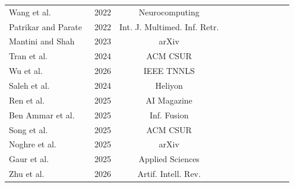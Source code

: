 \documentclass[10pt,a4paper]{article}
\newcommand{\CIRCLE}{\usebox{\hbFull}}
\newcommand{\LEFTcircle}{\usebox{\hbHalf}}
\newcommand{\Circle}{\usebox{\hbEmpty}}
\begin{document}
\begin{table}[!t]
{\begin{tabular}{llccccccccc}
Wang et al.~\citeyearpar{wang2022deep_fire} & 2022 & Neurocomputing & \Circle & \CIRCLE & \Circle & \CIRCLE & \LEFTcircle & \LEFTcircle & \Circle & \LEFTcircle \\
Patrikar and Parate~\citeyearpar{patrikar2022anomaly} & 2022 & Int. J. Multimed. Inf. Retr. & \CIRCLE & \Circle & \Circle & \CIRCLE & \CIRCLE & \LEFTcircle & \Circle & \LEFTcircle \\
Mantini and Shah~\citeyearpar{mantini2023feature_survey} & 2023 & arXiv & \Circle & \Circle & \CIRCLE & \LEFTcircle & \Circle & \Circle & \Circle & \LEFTcircle \\
Tran et al.~\citeyearpar{tran2024anomaly_images_videos} & 2024 & ACM CSUR & \CIRCLE & \Circle & \Circle & \CIRCLE & \CIRCLE & \CIRCLE & \LEFTcircle & \Circle \\
Wu et al.~\citeyearpar{wu2024deep_review} & 2026 & IEEE TNNLS & \CIRCLE & \Circle & \Circle & \CIRCLE & \CIRCLE & \CIRCLE & \LEFTcircle & \LEFTcircle \\
Saleh et al.~\citeyearpar{saleh2024forest_fire} & 2024 & Heliyon & \Circle & \CIRCLE & \Circle & \CIRCLE & \LEFTcircle & \LEFTcircle & \Circle & \LEFTcircle \\
Ren et al.~\citeyearpar{ren2025foundation_anomaly} & 2025 & AI Magazine & \LEFTcircle & \Circle & \Circle & \LEFTcircle & \LEFTcircle & \CIRCLE & \CIRCLE & \LEFTcircle \\
Ben Ammar et al.~\citeyearpar{benammar2025foundation_transformer} & 2025 & Inf. Fusion & \LEFTcircle & \Circle & \Circle & \LEFTcircle & \LEFTcircle & \CIRCLE & \CIRCLE & \Circle \\
Song et al.~\citeyearpar{song2024networking_vad} & 2025 & ACM CSUR & \CIRCLE & \Circle & \Circle & \CIRCLE & \CIRCLE & \CIRCLE & \LEFTcircle & \CIRCLE \\
Noghre et al.~\citeyearpar{noghre2025survey_human_vehicle} & 2025 & arXiv & \CIRCLE & \LEFTcircle & \Circle & \CIRCLE & \CIRCLE & \CIRCLE & \LEFTcircle & \LEFTcircle \\
Gaur et al.~\citeyearpar{gaur2025early_fire_smoke} & 2025 & Applied Sciences & \Circle & \CIRCLE & \Circle & \CIRCLE & \LEFTcircle & \CIRCLE & \LEFTcircle & \LEFTcircle \\
Zhu et al.~\citeyearpar{zhu2026generative} & 2026 & Artif. Intell. Rev. & \LEFTcircle & \Circle & \Circle & \CIRCLE & \CIRCLE & \CIRCLE & \CIRCLE & \LEFTcircle \\
\bottomrule
\end{tabular}%
}
\end{table}
\end{document}
